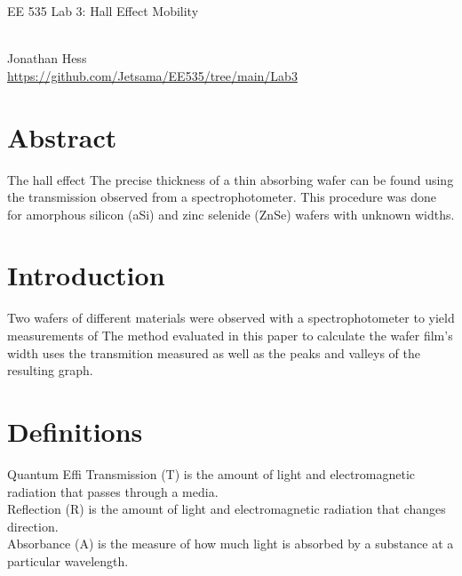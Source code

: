 \documentclass[10pt,a4paper]{article}
\begin{document}
\begin{multicols}{2}
\newenvironment{indentPar}[1]%
 {\begin{list}{}%
         {\setlength{\leftmargin}{#1}}%
         \item[]%
 }
 {\end{list}}

\begin{flushleft}
\begin{LARGE}EE 535 Lab 3: Hall Effect Mobility
\end{LARGE}	
\\Jonathan Hess
\\\href{https://github.com/Jetsama/EE535/tree/main/Lab3}{https://github.com/Jetsama/EE535/tree/main/Lab3}
\end{flushleft}


\section*{Abstract}
The hall effect
The precise thickness of a thin absorbing wafer can be found using the transmission observed from a spectrophotometer. This procedure was done for amorphous silicon (aSi) and zinc selenide (ZnSe) wafers with unknown widths.





\section*{Introduction}

Two wafers of different materials were observed with a spectrophotometer to yield measurements of The method evaluated in this paper to calculate the wafer film's width uses the transmition measured as well as the peaks and valleys of the resulting graph. 




\section*{Definitions}
Quantum Effi
Transmission (T) is the amount of light and electromagnetic radiation that passes through a media.\\
Reflection (R) is the amount of light and electromagnetic radiation that changes direction. \\
Absorbance (A) is the measure of how much light is absorbed by a substance at a particular wavelength.\\




\end{multicols}
\end{document}
